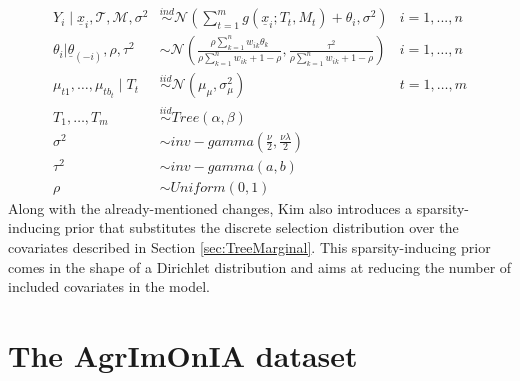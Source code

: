 \documentclass[11pt,a4paper]{article}
\newcommand{\vect}[1]{\underline{#1}}
\begin{document}
\begin{align}
    Y_i \mid \underline{x}_i, \mathcal{T}, \mathcal{M}, \sigma^2 & \stackrel{ind}{\sim} \mathcal{N}\left(\sum_{t=1}^mg\left(\underline{x}_i;  T_t, M_t\right) + \theta_i, \sigma^2\right)                                   & i = 1,...,n     \\
    \theta_i | \vect{\theta}_{(-i)}, \rho, \tau^2                & \sim \mathcal{N}\left(\frac{\rho\sum_{k=1}^nw_{ik}\theta_k}{\rho\sum_{k=1}^nw_{ik} + 1 - \rho}, \frac{\tau^2}{\rho\sum_{k=1}^nw_{ik}  + 1 - \rho}\right) & i = 1, \dots, n \\
    \mu_{t1}, \dots, \mu_{tb_t} \mid T_t                         & \stackrel{iid}{\sim} \mathcal{N}(\mu_{\mu}, \sigma^2_{\mu})                                                                                              & t = 1,\dots,m   \\
    T_1, \dots, T_m                                              & \stackrel{iid}{\sim} Tree(\alpha, \beta)                                                                                                                 &                 \\
    \sigma^2                                                     & \sim inv-gamma\left(\frac{\nu}{2}, \frac{\nu\lambda}{2}\right)                                                                                           &                 \\
    \tau^2                                                       & \sim inv-gamma(a,b)                                                                                                                                      &                 \\
    \rho                                                         & \sim Uniform(0, 1)                                                                                                                                       &
\end{align}
Along with the already-mentioned changes, Kim also introduces a sparsity-inducing prior that substitutes the discrete selection distribution over the covariates described in Section \ref{sec:TreeMarginal}. This sparsity-inducing prior comes in the shape of a Dirichlet distribution and aims at reducing the number of included covariates in the model.

\section{The AgrImOnIA dataset}
\label{sec:AGRIMONIA}
\end{document}
